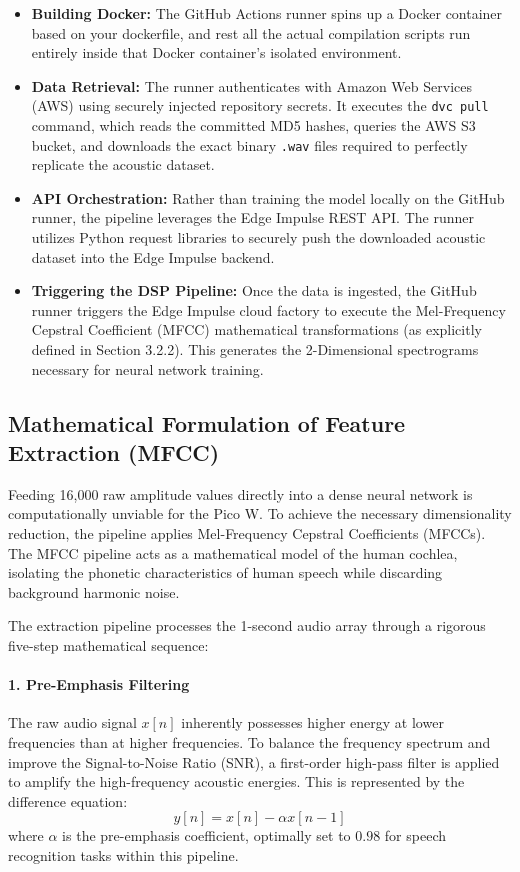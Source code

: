 \documentclass[11pt,a4paper,openany]{book}
\begin{document}
\begin{itemize}
    \item \textbf{Building Docker:} The GitHub Actions runner spins up a Docker container based on your dockerfile, and rest all the actual compilation scripts run entirely inside that Docker container's isolated environment.
    \item \textbf{Data Retrieval:} The runner authenticates with Amazon Web Services (AWS) using securely injected repository secrets. It executes the \texttt{dvc pull} command, which reads the committed MD5 hashes, queries the AWS S3 bucket, and downloads the exact binary \texttt{.wav} files required to perfectly replicate the acoustic dataset.
    \item \textbf{API Orchestration:} Rather than training the model locally on the GitHub runner, the pipeline leverages the Edge Impulse REST API. The runner utilizes Python request libraries to securely push the downloaded acoustic dataset into the Edge Impulse backend.
    \item \textbf{Triggering the DSP Pipeline:} Once the data is ingested, the GitHub runner triggers the Edge Impulse cloud factory to execute the Mel-Frequency Cepstral Coefficient (MFCC) mathematical transformations (as explicitly defined in Section 3.2.2). This generates the 2-Dimensional spectrograms necessary for neural network training.
\end{itemize}

\subsection{Mathematical Formulation of Feature Extraction (MFCC)}
Feeding 16,000 raw amplitude values directly into a dense neural network is computationally unviable for the Pico W. To achieve the necessary dimensionality reduction, the pipeline applies Mel-Frequency Cepstral Coefficients (MFCCs). The MFCC pipeline acts as a mathematical model of the human cochlea, isolating the phonetic characteristics of human speech while discarding background harmonic noise.

The extraction pipeline processes the 1-second audio array through a rigorous five-step mathematical sequence:

\paragraph{1. Pre-Emphasis Filtering}
The raw audio signal $x[n]$ inherently possesses higher energy at lower frequencies than at higher frequencies. To balance the frequency spectrum and improve the Signal-to-Noise Ratio (SNR), a first-order high-pass filter is applied to amplify the high-frequency acoustic energies. This is represented by the difference equation:
\begin{equation}
y[n] = x[n] - \alpha x[n-1]
\end{equation}
where $\alpha$ is the pre-emphasis coefficient, optimally set to $0.98$ for speech recognition tasks within this pipeline.
\end{document}
